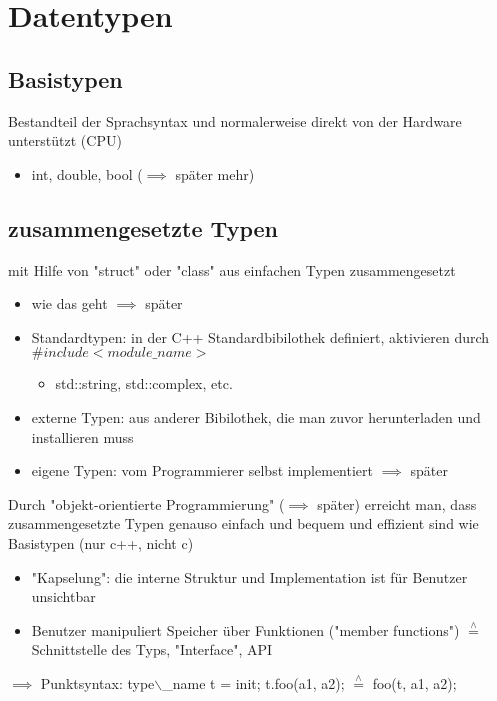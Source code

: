 \documentclass[a4paper]{scrartcl}
\newcommand{\estimates}{\overset{\scriptscriptstyle\wedge}{=}}%
\theoremstyle{definition}
\theoremstyle{plain}
\theoremstyle{remark}
\theoremstyle{remark}
\begin{document}
\section{Datentypen}
\label{sec-8}
\subsection{Basistypen}
\label{sec-8-1}
Bestandteil der Sprachsyntax und normalerweise direkt von der Hardware unterstützt (CPU)
\begin{itemize}
\item int, double, bool ($\implies$ später mehr)
\end{itemize}
\subsection{zusammengesetzte Typen}
\label{sec-8-2}
mit Hilfe von "struct" oder "class" aus einfachen Typen zusammengesetzt
\begin{itemize}
\item wie das geht $\implies$ später
\item Standardtypen: in der C++ Standardbibilothek definiert, aktivieren durch $\#include <module\_name>$
\begin{itemize}
\item std::string, std::complex, etc.
\end{itemize}
\item externe Typen: aus anderer Bibilothek, die man zuvor herunterladen und installieren muss
\item eigene Typen: vom Programmierer selbst implementiert $\implies$ später
\end{itemize}
Durch "objekt-orientierte Programmierung" ($\implies$ später) erreicht man, dass zusammengesetzte
 Typen genauso einfach und bequem und effizient sind wie Basistypen (nur c++, nicht c)
\begin{itemize}
\item "Kapselung": die interne Struktur und Implementation ist für Benutzer unsichtbar
\item Benutzer manipuliert Speicher über Funktionen ("member functions") $\estimates$ Schnittstelle des Typs, "Interface", API
\end{itemize}

$\implies$ Punktsyntax: type$\backslash$\_name t = init; t.foo(a1, a2); $\estimates$ foo(t, a1, a2);
\end{document}
